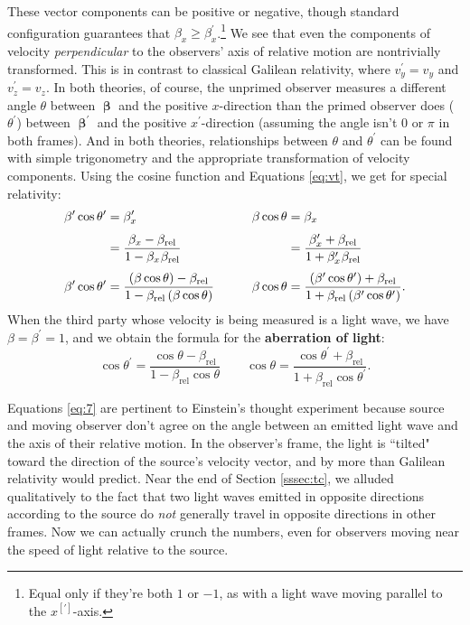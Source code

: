 \documentclass[12pt]{article}
\newcommand{\vvbeta}{\bm{\upbeta}}
\begin{document}
These vector components can be positive or negative, though standard configuration guarantees that $ \beta_x \geq \beta_x^\prime $.\footnote{Equal only if they're both $1$ or $-1$, as with a light wave moving parallel to the $x^{[\prime]}$-axis.} We see that even the components of velocity \emph{perpendicular} to the observers' axis of relative motion are nontrivially transformed. This is in contrast to classical Galilean relativity, where $v_y^{\prime} = v_y$ and $v_z^{\prime} = v_z$. In both theories, of course, the unprimed observer measures a different angle $\theta$ between $\vvbeta$ and the positive $x$-direction than the primed observer does ($\theta^\prime$) between $\vvbeta^{\prime}$ and the positive $x^\prime$-direction (assuming the angle isn't $0$ or $\pi$ in both frames). And in both theories, relationships between $\theta$ and $\theta^{\prime}$ can be found with simple trigonometry and the appropriate transformation of velocity components. Using the cosine function and Equations \ref{eq:vt}, we get for special relativity:
\begin{equation*}
\begin{aligned}
\beta^\prime \cos \theta^\prime &= \beta_x^\prime &\qquad \beta \cos \theta &= \beta_x \\[3pt]
&= \dfrac{\beta_x - \beta_{\textrm{rel}}}{1 - \beta_{x} \mkern1mu \beta_{\textrm{rel}}} &\qquad &= \dfrac{\beta_x^\prime + \beta_{\textrm{rel}}}{1 + \beta_x^\prime \mkern1mu \beta_{\textrm{rel}}} \\[3pt]
\beta^\prime \cos \theta^\prime &= \frac{\left( \beta \cos \theta \right) - \beta_{\textrm{rel}}}{1 - \beta_{\textrm{rel}} \left( \beta \cos \theta \right)} &\qquad \beta \cos \theta &=\frac{\left( \beta^\prime \cos \theta^\prime \right) + \beta_{\textrm{rel}}}{1 + \beta_{\textrm{rel}} \left( \beta^\prime \cos \theta^\prime \right)} .
\end{aligned}
\end{equation*}
When the third party whose velocity is being measured is a light wave, we have $\beta = \beta^\prime = 1$, and we obtain the formula for the \textbf{aberration of light}:
\begin{equation}\label{eq:7}
\cos \theta^\prime =\frac{\cos \theta - \beta_{\textrm{rel}}}{1 - \beta_{\textrm{rel}} \cos \theta} \qquad \cos \theta =\frac{\cos \theta^\prime + \beta_{\textrm{rel}}}{1 + \beta_{\textrm{rel}} \cos \theta^\prime}.
\end{equation}

Equations \ref{eq:7} are pertinent to Einstein's thought experiment because source and moving observer don't agree on the angle between an emitted light wave and the axis of their relative motion. In the observer's frame, the light is ``tilted" toward the direction of the source's velocity vector, and by more than Galilean relativity would predict. Near the end of Section \ref{sssec:tc}, we alluded qualitatively to the fact that two light waves emitted in opposite directions according to the source do \emph{not} generally travel in opposite directions in other frames. Now we can actually crunch the numbers, even for observers moving near the speed of light relative to the source.
\end{document}
